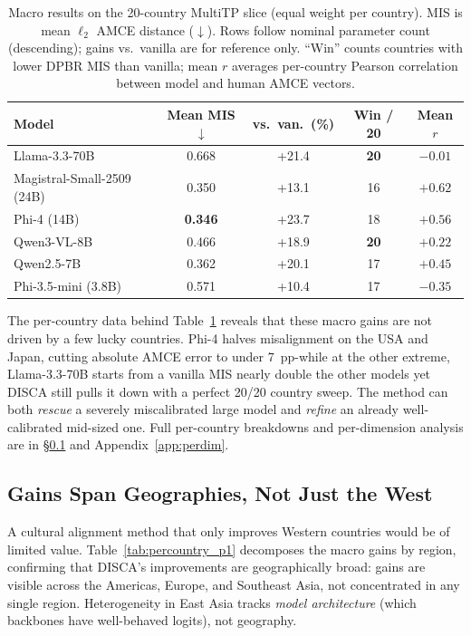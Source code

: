 \documentclass{article}
\newcommand{\gain}[1]{\textcolor{improvegreen}{#1}}
\begin{document}
\begin{table}[t]
\caption{Macro results on the 20-country MultiTP slice (equal weight per country).
MIS is mean $\ell_2$ AMCE distance ($\downarrow$). Rows follow nominal parameter count
(descending); gains vs.\ vanilla are for reference only. ``Win'' counts countries with
lower DPBR MIS than vanilla; mean $r$ averages per-country Pearson correlation between
model and human AMCE vectors.}
\label{tab:main_macro_summary}
\centering\scriptsize
\setlength{\tabcolsep}{3pt}
\begin{tabular}{@{}lcccc@{}}
\toprule
Model & Mean MIS $\downarrow$ & vs.\ van.\ (\%) & Win / 20 & Mean $r$ \\
\midrule
Llama-3.3-70B              & 0.668 & \gain{+21.4} & \textbf{20} & $-0.01$ \\
Magistral-Small-2509 (24B) & 0.350 & \gain{+13.1} & 16          & $+0.62$ \\
Phi-4 (14B)                & \textbf{0.346} & \gain{+23.7} & 18          & $+0.56$ \\
Qwen3-VL-8B                & 0.466 & \gain{+18.9} & \textbf{20} & $+0.22$ \\
Qwen2.5-7B                 & 0.362 & \gain{+20.1} & 17          & $+0.45$ \\
Phi-3.5-mini (3.8B)        & 0.571 & \gain{+10.4} & 17          & $-0.35$ \\
\bottomrule
\end{tabular}
\end{table}

The per-country data behind Table~\ref{tab:main_macro_summary} reveals that these
macro gains are not driven by a few lucky countries. Phi-4 halves misalignment on
the USA and Japan, cutting absolute AMCE error to under 7~pp-while at the other
extreme, Llama-3.3-70B starts from a vanilla MIS nearly double the other models yet
DISCA still pulls it down with a perfect 20/20 country sweep. The method can both
\emph{rescue} a severely miscalibrated large model and \emph{refine} an already
well-calibrated mid-sized one. Full per-country breakdowns and per-dimension analysis
are in \S\ref{sec:percountry_main} and Appendix~\ref{app:perdim}.

\subsection{Gains Span Geographies, Not Just the West}
\label{sec:percountry_main}

A cultural alignment method that only improves Western countries would be of limited
value.
Table~\ref{tab:percountry_p1} decomposes the macro gains by region, confirming that
DISCA's improvements are geographically broad: gains are visible across
the Americas, Europe, and Southeast Asia, not concentrated in any single region.
Heterogeneity in East Asia tracks \emph{model architecture} (which backbones have
well-behaved logits), not geography.
\end{document}

